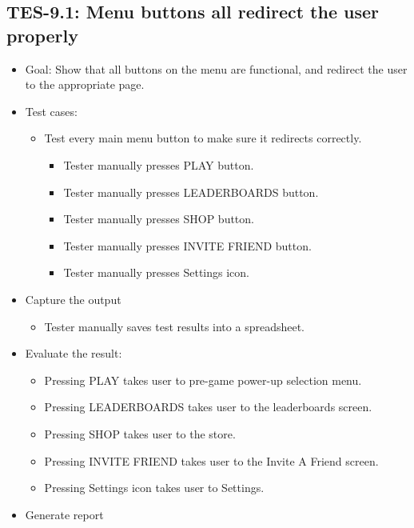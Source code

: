 \subsection{TES-9.1: Menu buttons all redirect the user properly }
\begin{itemize}
\item Goal: Show that all buttons on the menu are functional, and redirect the user to the appropriate page.
\item Test cases: 

\begin{itemize}
\item Test every main menu button to make sure it redirects correctly.

\begin{itemize}
\item Tester manually presses PLAY button.
\item Tester manually presses LEADERBOARDS button.
\item Tester manually presses SHOP button.
\item Tester manually presses INVITE FRIEND button.
\item Tester manually presses Settings icon.

\end{itemize}

\end{itemize}
\item Capture the output
\begin{itemize}
\item Tester manually saves test results into a spreadsheet.
\end{itemize}
\item Evaluate the result: 

\begin{itemize}
\item \label{select}
Pressing PLAY takes user to pre-game power-up selection menu.
\item Pressing LEADERBOARDS takes user to the leaderboards screen.
\item Pressing SHOP takes user to the store.
\item Pressing INVITE FRIEND takes user to the Invite A Friend screen.
\item Pressing Settings icon takes user to Settings.
\end{itemize}
\item Generate report
\end{itemize}

